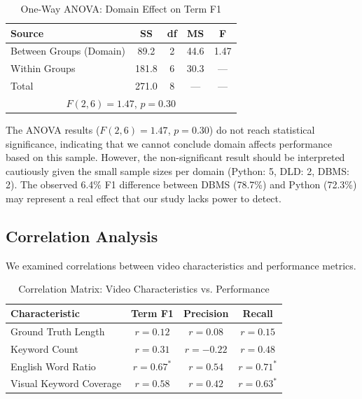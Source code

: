 \begin{table}[h]
\centering
\caption{One-Way ANOVA: Domain Effect on Term F1}
\label{tab:anova_domain}
\begin{tabular}{|l|c|c|c|c|}
\hline
\textbf{Source} & \textbf{SS} & \textbf{df} & \textbf{MS} & \textbf{F} \\
\hline
Between Groups (Domain) & 89.2 & 2 & 44.6 & 1.47 \\
\hline
Within Groups & 181.8 & 6 & 30.3 & --- \\
\hline
Total & 271.0 & 8 & --- & --- \\
\hline
\multicolumn{5}{|c|}{$F(2,6) = 1.47$, $p = 0.30$} \\
\hline
\end{tabular}
\end{table}

The ANOVA results ($F(2,6) = 1.47$, $p = 0.30$) do not reach statistical significance, indicating that we cannot conclude domain affects performance based on this sample. However, the non-significant result should be interpreted cautiously given the small sample sizes per domain (Python: 5, DLD: 2, DBMS: 2). The observed 6.4\% F1 difference between DBMS (78.7\%) and Python (72.3\%) may represent a real effect that our study lacks power to detect.

\subsection{Correlation Analysis}

We examined correlations between video characteristics and performance metrics.

\begin{table}[h]
\centering
\caption{Correlation Matrix: Video Characteristics vs. Performance}
\label{tab:correlations}
\begin{tabular}{|l|c|c|c|}
\hline
\textbf{Characteristic} & \textbf{Term F1} & \textbf{Precision} & \textbf{Recall} \\
\hline
Ground Truth Length & $r = 0.12$ & $r = 0.08$ & $r = 0.15$ \\
\hline
Keyword Count & $r = 0.31$ & $r = -0.22$ & $r = 0.48$ \\
\hline
English Word Ratio & $r = 0.67^*$ & $r = 0.54$ & $r = 0.71^*$ \\
\hline
Visual Keyword Coverage & $r = 0.58$ & $r = 0.42$ & $r = 0.63^*$ \\
\hline
\end{tabular}
\end{table}

